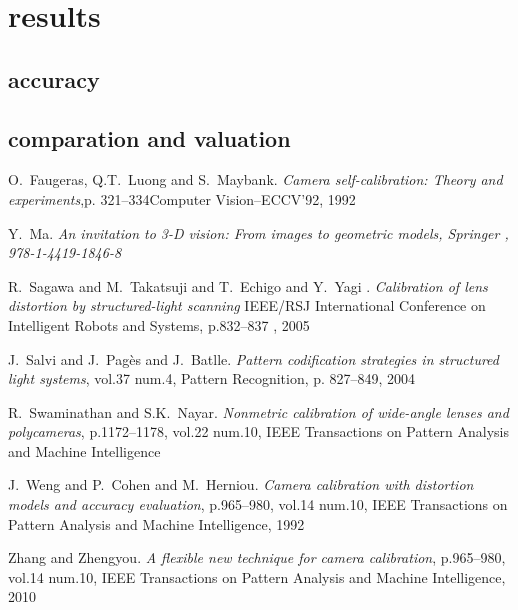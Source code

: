\documentclass[journal,final,a4paper,twoside]{PS}
\begin{document}
\section{results}
\label{sec:results}
\subsection{accuracy}
\subsection{comparation and valuation}


\newpage

\begin{thebibliography}{1}
O.~Faugeras, Q.T.~Luong and S.~Maybank. \emph{Camera self-calibration: Theory and experiments},p. 321--334Computer Vision--ECCV'92, 1992

Y.~Ma. \emph{{An invitation to 3-D vision: From images to geometric models}, {Springer} , {978-1-4419-1846-8}}

R.~Sagawa and M.~Takatsuji and T.~Echigo and Y.~Yagi . \emph{Calibration of lens distortion by structured-light scanning} IEEE/RSJ International Conference on Intelligent Robots and Systems, p.832--837 , 2005

J.~Salvi and J.~Pag{\`e}s and J.~Batlle. \emph{Pattern codification strategies in structured light systems}, vol.37 num.4, Pattern Recognition, p. 827--849, 2004

R.~Swaminathan and S.K.~Nayar. \emph{Nonmetric calibration of wide-angle lenses and polycameras}, p.1172--1178, vol.22 num.10, IEEE Transactions on Pattern Analysis and Machine Intelligence

J.~Weng and P.~Cohen and M.~Herniou. \emph{Camera calibration with distortion models and accuracy evaluation}, p.965--980, vol.14 num.10, IEEE Transactions on Pattern Analysis and Machine Intelligence, 1992

Zhang and Zhengyou. \emph{A flexible new technique for camera calibration}, p.965--980, vol.14 num.10, IEEE Transactions on Pattern Analysis and Machine Intelligence, 2010


\end{thebibliography}
\end{document}
